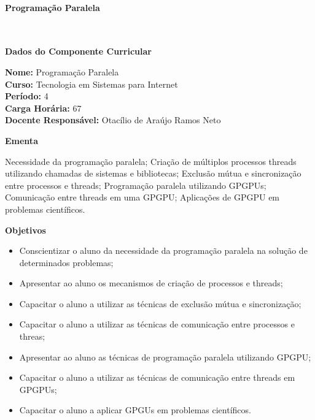 \paragraph{Programação Paralela} \


\begin{snugshade}\begin{center}\textbf{
	Dados do Componente Curricular
}\end{center}\end{snugshade}

\noindent 	\textbf{Nome:} Programação Paralela
\\ 			\textbf{Curso:} Tecnologia em Sistemas para Internet
\\ 			\textbf{Período:} \unit{4}{\degree}
\\ 			\textbf{Carga Horária:} \unit{67}{\hour}
\\ 			\textbf{Docente Responsável:} Otacílio de Araújo Ramos Neto


\begin{snugshade}\begin{center}\textbf{
    Ementa
\vphantom{q}}\end{center}\end{snugshade}

\noindent
Necessidade da programação paralela; Criação de múltiplos processos threads utilizando chamadas de sistemas e bibliotecas; Exclusão mútua e sincronização entre processos e threads; Programação paralela utilizando GPGPUs; Comunicação entre threads em uma GPGPU; Aplicações de GPGPU em problemas científicos.

\begin{snugshade}\begin{center}\textbf{
    Objetivos
}\end{center}\end{snugshade}

\begin{itemize}

\item Conscientizar o aluno da necessidade da programação paralela na solução de determinados problemas;
\item Apresentar ao aluno os mecanismos de criação de processos e threads;
\item Capacitar o aluno a utilizar as técnicas de exclusão mútua e sincronização;
\item Capacitar o aluno a utilizar as técnicas de comunicação entre processos e threas;
\item Apresentar ao aluno as técnicas de programação paralela utilizando GPGPU;
\item Capacitar o aluno a utilizar as técnicas de comunicação entre threads em GPGPUs;
\item Capacitar o aluno a aplicar GPGUs em problemas científicos.

\end{itemize} 

